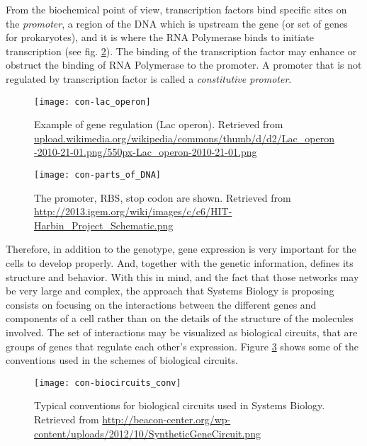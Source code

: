 From the biochemical point of view, transcription factors bind specific sites on the \textit{promoter}, a region of the DNA which is upstream the gene (or set of genes for prokaryotes), and it is where the RNA Polymerase binds to initiate transcription (see fig. \ref{fig:con-parts_of_DNA}). The binding of the transcription factor may enhance or obstruct the binding of RNA Polymerase to the promoter. A promoter that is not regulated by transcription factor is called a \textit{constitutive promoter}.

\begin{figure}[H]
  \centering
  \texttt{[image: con-lac\_operon]}
  \caption[Example of gene regulation]{\label{fig:con-lac_operon} Example of gene regulation (Lac operon). Retrieved from \url{upload.wikimedia.org/wikipedia/commons/thumb/d/d2/Lac_operon-2010-21-01.png/550px-Lac_operon-2010-21-01.png}}
\end{figure}

\begin{figure}[H]
  \centering
  \texttt{[image: con-parts\_of\_DNA]}
  \caption[Parts of a gene]{\label{fig:con-parts_of_DNA} The promoter, RBS, stop codon are shown. Retrieved from \url{http://2013.igem.org/wiki/images/c/c6/HIT-Harbin_Project_Schematic.png}}
\end{figure}

Therefore, in addition to the genotype, gene expression is very important for the cells to develop properly. And, together with the genetic information, defines its structure and behavior. With this in mind, and the fact that those networks may be very large and complex, the approach that Systems Biology is proposing consists on focusing on the interactions between the different genes and components of a cell rather than on the details of the structure of the molecules involved. The set of interactions may be visualized as biological circuits, that are groups of genes that regulate each other's expression. Figure \ref{fig:con-biocircuits_conv} shows some of the conventions used in the schemes of biological circuits.

\begin{figure}[H]
  \centering
  \texttt{[image: con-biocircuits\_conv]}
  \caption[Systems biology conventions]{\label{fig:con-biocircuits_conv} Typical conventions for biological circuits used in Systems Biology. Retrieved from \url{http://beacon-center.org/wp-content/uploads/2012/10/SyntheticGeneCircuit.png}}
\end{figure}

